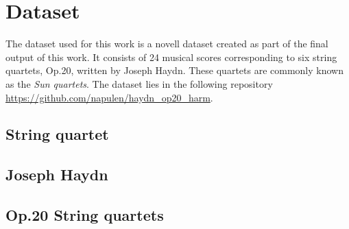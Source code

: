 \chapter{Dataset}
\label{chap:dataset}
The dataset used for this work is a novell dataset created as part of the final output of this work. It consists of 24 musical scores corresponding to six string quartets, Op.20, written by Joseph Haydn. These quartets are commonly known as the \emph{Sun quartets}. The dataset lies in the following repository \url{https://github.com/napulen/haydn_op20_harm}.

\section{String quartet}

\section{Joseph Haydn}

\section{Op.20 String quartets}

\newpage
